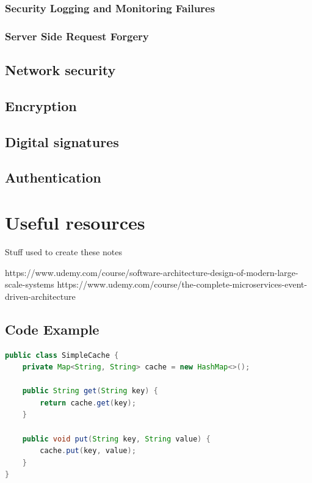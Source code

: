 \documentclass[a4paper, 11pt]{book}
\begin{document}
    \subsection{Security Logging and Monitoring Failures}

    \subsection{Server Side Request Forgery}

    \section{Network security}

    \section{Encryption}

    \section{Digital signatures}

    \section{Authentication}

    \chapter{Useful resources}
    Stuff used to create these notes

    https://www.udemy.com/course/software-architecture-design-of-modern-large-scale-systems
    https://www.udemy.com/course/the-complete-microservices-event-driven-architecture

    \newpage


    \section{Code Example}
    \begin{lstlisting}[language=Java, caption=Java Code for a Simple Cache]
public class SimpleCache {
    private Map<String, String> cache = new HashMap<>();

    public String get(String key) {
        return cache.get(key);
    }

    public void put(String key, String value) {
        cache.put(key, value);
    }
}
    \end{lstlisting}
\end{document}
